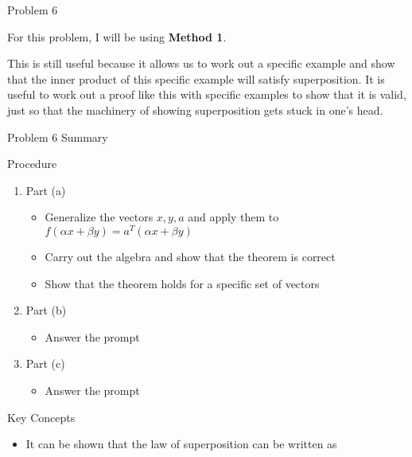 \begin{problem}{Problem 6}
    \begin{highlight}
        For this problem, I will be using \textbf{Method 1}. \vspace*{1em} 

        This is still useful because it allows us to work out a specific example and show that the inner product of this specific example will satisfy superposition. It is useful to work out a proof like
        this with specific examples to show that it is valid, just so that the machinery of showing superposition gets stuck in one's head.
    \end{highlight}
\end{problem}

\begin{summary}{Problem 6 Summary}
    \begin{statement}{Procedure}
        \begin{enumerate}[label = (\alph*)]
            \item Part (a)
            \begin{itemize}
                \item Generalize the vectors $x, y, a$ and apply them to $f(\alpha x + \beta y) = a^{T}(\alpha x + \beta y)$ 
                \item Carry out the algebra and show that the theorem is correct
                \item Show that the theorem holds for a specific set of vectors
            \end{itemize}
            \item Part (b)
            \begin{itemize}
                \item Answer the prompt
            \end{itemize}
            \item Part (c)
            \begin{itemize}
                \item Answer the prompt
            \end{itemize}
        \end{enumerate}
    \end{statement}
    \begin{statement}{Key Concepts}
        \begin{itemize}
            \item It can be shown that the law of superposition can be written as 
            \begin{equation*}

\end{equation*}
\end{itemize}
\end{statement}
\end{summary}
